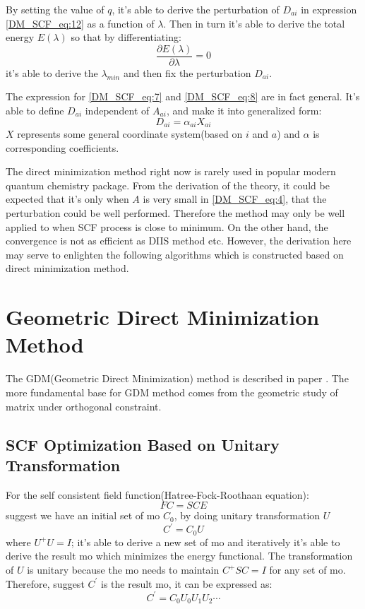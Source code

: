 By setting the value of $q$, it's able to derive the perturbation of $D_{ai}$ in expression
\ref{DM_SCF_eq:12} as a function of $\lambda$. Then in turn it's able to derive the total
energy $E(\lambda)$ so that by differentiating:
\begin{equation}
 \frac{\partial  E(\lambda)}{\partial \lambda} = 0
\end{equation}
it's able to derive the $\lambda_{min}$ and then fix the perturbation $D_{ai}$.

The expression for \ref{DM_SCF_eq:7} and \ref{DM_SCF_eq:8} are in fact general. It's able to 
define $D_{ai}$ independent of $A_{ai}$, and make it into generalized form:
\begin{equation}\label{DM_SCF_eq:14}
 D_{ai} = \alpha_{ai}X_{ai}
\end{equation}
$X$ represents some general coordinate system(based on $i$ and $a$) and $\alpha$ is corresponding 
coefficients.

The direct minimization method right now is rarely used in popular modern quantum chemistry
package. From the derivation of the theory, it could be expected that it's only when $A$ is 
very small in \ref{DM_SCF_eq:4}, that the perturbation could be well performed. Therefore
the method may only be well applied to when SCF process is close to minimum. On the other 
hand, the convergence is not as efficient as DIIS method etc. However, the derivation here 
may serve to enlighten the following algorithms which is constructed based on direct 
minimization method.

\section{Geometric Direct Minimization Method}
%
%
%
The GDM(Geometric Direct Minimization) method is described in paper \cite{gdm,gdm_fock}. The more
fundamental base for GDM method comes from the geometric study of matrix under orthogonal 
constraint\cite{doi:10.1137/S0895479895290954}.

\subsection{SCF Optimization Based on Unitary Transformation}
%
%
%
For the self consistent field function(Hatree-Fock-Roothaan equation):
\begin{equation}\label{gdm_eq:1}
 FC = SCE
\end{equation}
suggest we have an initial set of mo $C_{0}$, by doing unitary transformation $U$
\begin{equation}\label{gdm_eq:2}
 C^{'} = C_{0}U
\end{equation}
where $U^{+}U = I$; it's able to derive a new set of mo and iteratively it's able to derive 
the result mo which minimizes the energy functional. The transformation of $U$ is unitary 
because the mo needs to maintain $C^{+}SC=I$ for any set of mo. Therefore, suggest $C^{'}$ 
is the result mo, it can be expressed as:
\begin{equation}\label{gdm_eq:3}
 C^{'} = C_{0}U_{0}U_{1}U_{2}\cdots
\end{equation}


